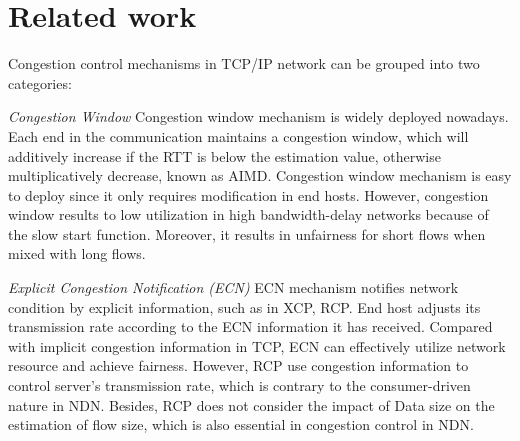 
\section{Related work}

\label{sec:related}




Congestion control mechanisms in TCP/IP network can be grouped into two categories:

\emph{Congestion Window} Congestion window mechanism is widely deployed nowadays. Each end in the communication maintains a congestion window, which will additively increase if the RTT is below the estimation value, otherwise multiplicatively decrease, known as AIMD\cite{TCP}. Congestion window mechanism is easy to deploy since it only requires modification in end hosts. However, congestion window results to low utilization in high bandwidth-delay networks because of the slow start function. Moreover, it results in unfairness for short flows when mixed with long flows.

\emph{Explicit Congestion Notification (ECN)} ECN mechanism notifies network condition by explicit information, such as in XCP\cite{XCP}, RCP\cite{RCP}.   End host adjusts its transmission rate according to the ECN information it has received. Compared with implicit congestion information in TCP, ECN can effectively utilize network resource and achieve fairness. However, RCP use congestion information to control server's transmission rate, which is contrary to the consumer-driven nature in NDN. Besides, RCP does not consider the impact of Data size on the estimation of flow size, which is also essential in congestion control in NDN. 

